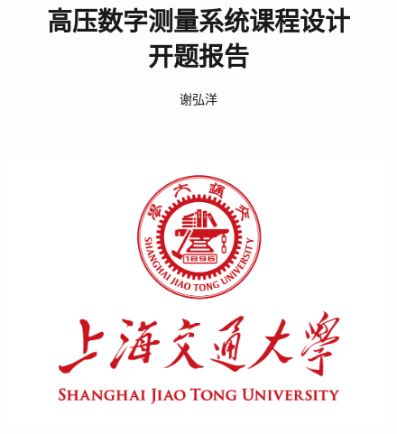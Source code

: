 \documentclass[a4paper,11pt]{ctexart}
\title
{
	\linespread{1.5} \zihao{4}
	高压数字测量系统课程设计 \\ 
	\zihao{2}
	开题报告
}
\author
{
	谢弘洋
}
\date{}
\begin{document}
	\pagestyle{plain}
	
\begin{figure}[t]
	\setlength{\abovecaptionskip}{-10mm}
	\setlength{\belowcaptionskip}{-60mm}
	\centering
	\includegraphics[scale=0.4]{page1.png}
\end{figure}
\end{document}
